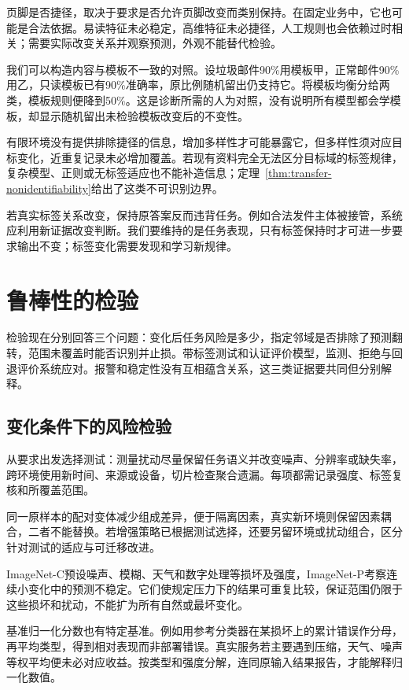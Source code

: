 页脚是否捷径，取决于要求是否允许页脚改变而类别保持。在固定业务中，它也可能是合法依据。易读特征未必稳定，高维特征未必捷径，人工规则也会依赖过时相关；需要实际改变关系并观察预测，外观不能替代检验。

我们可以构造内容与模板不一致的对照。设垃圾邮件90\%用模板甲，正常邮件90\%用乙，只读模板已有90\%准确率，原比例随机留出仍支持它。将模板均衡分给两类，模板规则便降到50\%。这是诊断所需的人为对照，没有说明所有模型都会学模板，却显示随机留出未检验模板改变后的不变性。

有限环境没有提供排除捷径的信息，增加多样性才可能暴露它，但多样性须对应目标变化，近重复记录未必增加覆盖。若现有资料完全无法区分目标域的标签规律，复杂模型、正则或无标签适应也不能补造信息；定理~\ref{thm:transfer-nonidentifiability}给出了这类不可识别边界。

若真实标签关系改变，保持原答案反而违背任务。例如合法发件主体被接管，系统应利用新证据改变判断。我们要维持的是任务表现，只有标签保持时才可进一步要求输出不变；标签变化需要发现和学习新规律。

\section{鲁棒性的检验}
\label{sec:robustness-evaluation}

检验现在分别回答三个问题：变化后任务风险是多少，指定邻域是否排除了预测翻转，范围未覆盖时能否识别并止损。带标签测试和认证评价模型，监测、拒绝与回退评价系统应对。报警和稳定性没有互相蕴含关系，这三类证据要共同但分别解释。

\subsection{变化条件下的风险检验}
\label{sec:robustness-risk-test}

从要求出发选择测试：测量扰动尽量保留任务语义并改变噪声、分辨率或缺失率，跨环境使用新时间、来源或设备，切片检查聚合遗漏。每项都需记录强度、标签复核和所覆盖范围。

同一原样本的配对变体减少组成差异，便于隔离因素，真实新环境则保留因素耦合，二者不能替换。若增强策略已根据测试选择，还要另留环境或扰动组合，区分针对测试的适应与可迁移改进。

ImageNet-C预设噪声、模糊、天气和数字处理等损坏及强度，ImageNet-P考察连续小变化中的预测不稳定。它们使规定压力下的结果可重复比较，保证范围仍限于这些损坏和扰动，不能扩为所有自然或最坏变化。

基准归一化分数也有特定基准。例如用参考分类器在某损坏上的累计错误作分母，再平均类型，得到相对表现而非部署错误。真实服务若主要遇到压缩，天气、噪声等权平均便未必对应收益。按类型和强度分解，连同原输入结果报告，才能解释归一化数值。

